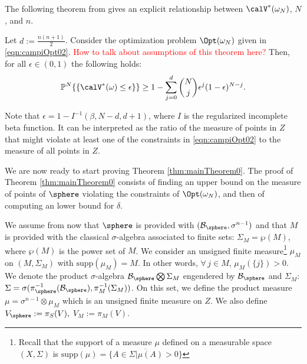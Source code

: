 The following theorem from \cite{campi} gives an explicit relationship between $\calV^*(\omega_N)$, $N$, and $n$.
\begin{theorem}\label{thm:campi}Let $d:=\frac{n(n+1)}{2}$. Consider the optimization problem $\Opt(\omega_N)$ given in \eqref{eqn:campiOpt02}. \textcolor{red}{How to talk about assumptions of this theorem here?} Then, for all $\epsilon \in (0,1)$ the following holds:
\begin{equation*}\mathbb{P}^N\{\{\calV^*(\omega) \leq \epsilon\} \} \geq 1- \sum_{j=0}^{d} \binom{N}{j}\epsilon^j (1-\epsilon)^{N-j}.\end{equation*}
\end{theorem}
Note that $\epsilon=1-I^{-1}(\beta, N-d, d+1)$, where $I$ is the regularized incomplete beta function. It can be interpreted as the ratio of the measure of points in $Z$ that might violate at least one of the constraints in \eqref{eqn:campiOpt02} to the measure of all points in $Z$.

We are now ready to start proving Theorem \ref{thm:mainTheorem0}. The proof of Theorem \ref{thm:mainTheorem0} consists of finding an upper bound on the measure of points of $\sphere$ violating the constraints of $\Opt(\omega_N)$, and then of computing an lower bound for $\delta$.

We assume from now that $\sphere$ is provided with $(\mathcal{B}_{\sphere},\sigma^{n-1})$ and that $M$ is provided with the classical $\sigma$-algebra associated to finite sets: $\Sigma_M = \wp(M)$, where $\wp(M)$ is the power set of $M$. We consider an unsigned finite measure\footnote{Recall that the support of a measure $\mu$ defined on a measurable space $(X, \Sigma)$ is $\text{supp}(\mu) = \overline{\{A \in \Sigma | \mu(A) > 0 \}}$} $\mu_M$ on $(M, \Sigma_M)$ with $\text{supp} (\mu_M) = M$. In other words, $\forall\,j \in M$, $\mu_M(\{j\})  > 0$. We denote the product $\sigma$-algebra $\mathcal{B}_{\sphere} \bigotimes \Sigma_M$ engendered by $\mathcal{B}_{\sphere}$ and $\Sigma_M$: $\Sigma = \sigma( \pi_{\sphere}^{-1}(\mathcal{B}_{\sphere}),  \pi_{M}^{-1}(\Sigma_M))$. On this set, we define the product measure $\mu = \sigma^{n-1} \otimes \mu_M$ which is an unsigned finite measure on $Z$. We also define $V_\sphere:=\pi_S(V),$ $V_M:=\pi_M(V)$.
